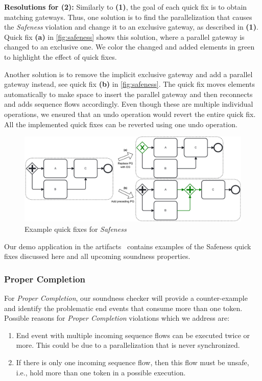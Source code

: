 \documentclass[runningheads]{llncs}
\begin{document}
\textbf{Resolutions for (2):} Similarly to \textbf{(1)}, the goal of each quick fix is to obtain matching gateways.
Thus, one solution is to find the parallelization that causes the \textit{Safeness} violation and change it to an exclusive gateway, as described in \textbf{(1)}.
Quick fix \textbf{(a)} in \autoref{fig:safeness} shows this solution, where a parallel gateway is changed to an exclusive one.
We color the changed and added elements in green to highlight the effect of quick fixes.

Another solution is to remove the implicit exclusive gateway and add a parallel gateway instead, see quick fix \textbf{(b)} in \autoref{fig:safeness}.
The quick fix moves elements automatically to make space to insert the parallel gateway and then reconnects and adds sequence flows accordingly.
Even though these are multiple individual operations, we ensured that an undo operation would revert the entire quick fix.
All the implemented quick fixes can be reverted using one undo operation.

\begin{figure}[ht]
	\centering
	\includegraphics[width=1\textwidth]{images/safeness}
	\caption{Example quick fixes for \textit{Safeness}}
	\label{fig:safeness}
\end{figure}

Our demo application in the artifacts~\cite{noauthorgivenBPM2024Artifacts2024} contains examples of the Safeness quick fixes discussed here and all upcoming soundness properties.

\subsubsection{Proper Completion}
For \textit{Proper Completion}, our soundness checker will provide a counter-example and identify the problematic end events that consume more than one token.
Possible reasons for \textit{Proper Completion} violations which we address are:

\begin{enumerate}
	\item End event with multiple incoming sequence flows can be executed twice or more.
	This could be due to a parallelization that is never synchronized.
	\item If there is only one incoming sequence flow, then this flow must be unsafe, i.e., hold more than one token in a possible execution.
\end{enumerate}
\end{document}
